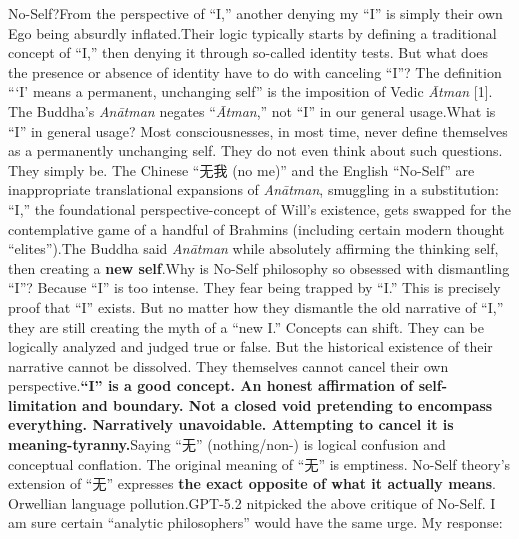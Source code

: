 \documentclass[11pt]{article}
\renewcommand{\\}[1][\mynewlineskip]{\oldnewline[#1]}
\begin{document}
\vspace{1em}
No-Self?\\
From the perspective of ``I,'' another denying my ``I'' is simply their own Ego being absurdly inflated.\\
Their logic typically starts by defining a traditional concept of ``I,'' then denying it through so-called identity tests. But what does the presence or absence of identity have to do with canceling ``I''? The definition ```I' means a permanent, unchanging self'' is the imposition of Vedic \textit{Ātman} [1]. The Buddha's \textit{Anātman} negates ``\textit{Ātman},'' not ``I'' in our general usage.\\
What is ``I'' in general usage? Most consciousnesses, in most time, never define themselves as a permanently unchanging self. They do not even think about such questions. They simply be. The Chinese ``无我 (no me)'' and the English ``No-Self'' are inappropriate translational expansions of \textit{Anātman}, smuggling in a substitution: ``I,'' the foundational perspective-concept of Will's existence, gets swapped for the contemplative game of a handful of Brahmins (including certain modern thought ``elites'').\\
The Buddha said \textit{Anātman} while absolutely affirming the thinking self, then creating a \textbf{new self}.\\
Why is No-Self philosophy so obsessed with dismantling ``I''? Because ``I'' is too intense. They fear being trapped by ``I.'' This is precisely proof that ``I'' exists. But no matter how they dismantle the old narrative of ``I,'' they are still creating the myth of a ``new I.'' Concepts can shift. They can be logically analyzed and judged true or false. But the historical existence of their narrative cannot be dissolved. They themselves cannot cancel their own perspective.\\
\textbf{``I'' is a good concept. An honest affirmation of self-limitation and boundary. Not a closed void pretending to encompass everything. Narratively unavoidable. Attempting to cancel it is meaning-tyranny.}\\
Saying ``无'' (nothing/non-) is logical confusion and conceptual conflation. The original meaning of ``无'' is emptiness. No-Self theory's extension of ``无'' expresses \textbf{the exact opposite of what it actually means}. Orwellian language pollution.\\
GPT-5.2 nitpicked the above critique of No-Self. I am sure certain ``analytic philosophers'' would have the same urge. My response:\\
\end{document}
